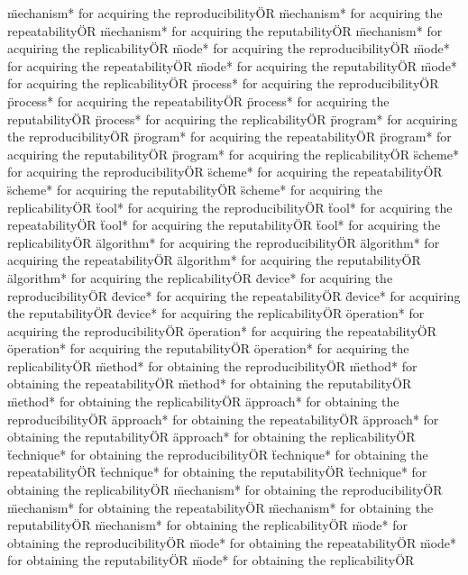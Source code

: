 \documentclass[
10pt, %
a4paper, %
oneside, %
headinclude,footinclude, %
BCOR5mm, %
]{scrartcl}
\begin{document}
\"mechanism* for acquiring the reproducibility\" OR \"mechanism* for acquiring the repeatability\" OR \"mechanism* for acquiring the reputability\" OR \"mechanism* for acquiring the replicability\" OR 
\"mode* for acquiring the reproducibility\" OR \"mode* for acquiring the repeatability\" OR \"mode* for acquiring the reputability\" OR \"mode* for acquiring the replicability\" OR 
\"process* for acquiring the reproducibility\" OR \"process* for acquiring the repeatability\" OR \"process* for acquiring the reputability\" OR \"process* for acquiring the replicability\" OR 
\"program* for acquiring the reproducibility\" OR \"program* for acquiring the repeatability\" OR \"program* for acquiring the reputability\" OR \"program* for acquiring the replicability\" OR 
\"scheme* for acquiring the reproducibility\" OR \"scheme* for acquiring the repeatability\" OR \"scheme* for acquiring the reputability\" OR \"scheme* for acquiring the replicability\" OR 
\"tool* for acquiring the reproducibility\" OR \"tool* for acquiring the repeatability\" OR \"tool* for acquiring the reputability\" OR \"tool* for acquiring the replicability\" OR 
\"algorithm* for acquiring the reproducibility\" OR \"algorithm* for acquiring the repeatability\" OR \"algorithm* for acquiring the reputability\" OR \"algorithm* for acquiring the replicability\" OR 
\"device* for acquiring the reproducibility\" OR \"device* for acquiring the repeatability\" OR \"device* for acquiring the reputability\" OR \"device* for acquiring the replicability\" OR 
\"operation* for acquiring the reproducibility\" OR \"operation* for acquiring the repeatability\" OR \"operation* for acquiring the reputability\" OR \"operation* for acquiring the replicability\" OR 
\"method* for obtaining the reproducibility\" OR \"method* for obtaining the repeatability\" OR \"method* for obtaining the reputability\" OR \"method* for obtaining the replicability\" OR 
\"approach* for obtaining the reproducibility\" OR \"approach* for obtaining the repeatability\" OR \"approach* for obtaining the reputability\" OR \"approach* for obtaining the replicability\" OR 
\"technique* for obtaining the reproducibility\" OR \"technique* for obtaining the repeatability\" OR \"technique* for obtaining the reputability\" OR \"technique* for obtaining the replicability\" OR 
\"mechanism* for obtaining the reproducibility\" OR \"mechanism* for obtaining the repeatability\" OR \"mechanism* for obtaining the reputability\" OR \"mechanism* for obtaining the replicability\" OR 
\"mode* for obtaining the reproducibility\" OR \"mode* for obtaining the repeatability\" OR \"mode* for obtaining the reputability\" OR \"mode* for obtaining the replicability\" OR 
\end{document}

